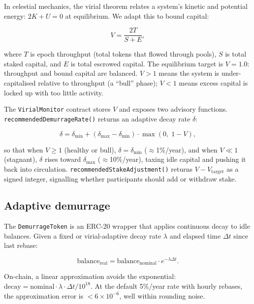 In celestial mechanics, the virial theorem relates a system's kinetic
and potential energy: $2K + U = 0$ at equilibrium. We adapt this to
bound capital:

\begin{equation}
  V = \frac{2T}{S + E},
  \label{eq:virial}
\end{equation}

\noindent where $T$ is epoch throughput (total tokens that flowed
through pools), $S$ is total staked capital, and $E$ is total escrowed
capital. The equilibrium target is $V = 1.0$: throughput and bound
capital are balanced. $V > 1$ means the system is under-capitalised
relative to throughput (a ``bull'' phase); $V < 1$ means excess capital
is locked up with too little activity.

The \texttt{VirialMonitor} contract stores $V$ and exposes two
advisory functions. \texttt{recommendedDemurrageRate()} returns an
adaptive decay rate $\delta$:

\begin{equation}
  \delta = \delta_{\min} + (\delta_{\max} - \delta_{\min}) \cdot
           \max(0,\; 1 - V),
  \label{eq:demurrage}
\end{equation}

\noindent so that when $V \geq 1$ (healthy or bull), $\delta =
\delta_{\min}$ ($\approx$1\%/year), and when $V \ll 1$ (stagnant),
$\delta$ rises toward $\delta_{\max}$ ($\approx$10\%/year), taxing idle
capital and pushing it back into circulation.
\texttt{recommendedStakeAdjustment()} returns $V - V_{\text{target}}$
as a signed integer, signalling whether participants should add or
withdraw stake.

\subsection{Adaptive demurrage}
\label{sec:demurrage}

The \texttt{DemurrageToken} is an ERC-20 wrapper that applies
continuous decay to idle balances. Given a fixed or virial-adaptive
decay rate $\lambda$ and elapsed time $\Delta t$ since last rebase:

\begin{equation}
  \text{balance}_{\text{real}} = \text{balance}_{\text{nominal}} \cdot
    e^{-\lambda \Delta t}.
  \label{eq:decay}
\end{equation}

On-chain, a linear approximation avoids the exponential:
$\text{decay} = \text{nominal} \cdot \lambda \cdot \Delta t / 10^{18}$.
At the default 5\%/year rate with hourly rebases, the approximation
error is $< 6 \times 10^{-6}$, well within rounding noise.

